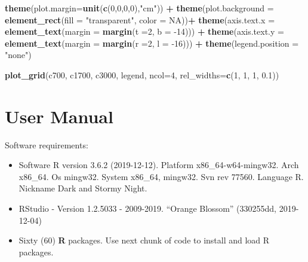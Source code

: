 \documentclass[12pt,oneside]{reedthesis}
\newenvironment{Shaded}{\begin{snugshade}}{\end{snugshade}}
\newcommand{\DataTypeTok}[1]{\textcolor[rgb]{0.13,0.29,0.53}{#1}}
\newcommand{\DecValTok}[1]{\textcolor[rgb]{0.00,0.00,0.81}{#1}}
\newcommand{\FloatTok}[1]{\textcolor[rgb]{0.00,0.00,0.81}{#1}}
\newcommand{\KeywordTok}[1]{\textcolor[rgb]{0.13,0.29,0.53}{\textbf{#1}}}
\newcommand{\NormalTok}[1]{#1}
\newcommand{\OperatorTok}[1]{\textcolor[rgb]{0.81,0.36,0.00}{\textbf{#1}}}
\newcommand{\OtherTok}[1]{\textcolor[rgb]{0.56,0.35,0.01}{#1}}
\newcommand{\StringTok}[1]{\textcolor[rgb]{0.31,0.60,0.02}{#1}}
\providecommand{\tightlist}{%
  \setlength{\itemsep}{0pt}\setlength{\parskip}{0pt}}
\begin{document}
\begin{Shaded}
\begin{Highlighting}[]
\StringTok{  }\KeywordTok{theme}\NormalTok{(}\DataTypeTok{plot.margin=}\KeywordTok{unit}\NormalTok{(}\KeywordTok{c}\NormalTok{(}\DecValTok{0}\NormalTok{,}\DecValTok{0}\NormalTok{,}\DecValTok{0}\NormalTok{,}\DecValTok{0}\NormalTok{),}\StringTok{"cm"}\NormalTok{)) }\OperatorTok{+}
\StringTok{  }\KeywordTok{theme}\NormalTok{(}\DataTypeTok{plot.background =} \KeywordTok{element_rect}\NormalTok{(}\DataTypeTok{fill =} \StringTok{"transparent"}\NormalTok{, }\DataTypeTok{color =} \OtherTok{NA}\NormalTok{))}\OperatorTok{+}
\StringTok{  }\KeywordTok{theme}\NormalTok{(}\DataTypeTok{axis.text.x =} \KeywordTok{element_text}\NormalTok{(}\DataTypeTok{margin =}  \KeywordTok{margin}\NormalTok{(}\DataTypeTok{t =}\DecValTok{2}\NormalTok{, }\DataTypeTok{b =} \DecValTok{-14}\NormalTok{))) }\OperatorTok{+}\StringTok{ }
\StringTok{  }\KeywordTok{theme}\NormalTok{(}\DataTypeTok{axis.text.y =} \KeywordTok{element_text}\NormalTok{(}\DataTypeTok{margin =}  \KeywordTok{margin}\NormalTok{(}\DataTypeTok{r =}\DecValTok{2}\NormalTok{, }\DataTypeTok{l =} \DecValTok{-16}\NormalTok{))) }\OperatorTok{+}
\StringTok{  }\KeywordTok{theme}\NormalTok{(}\DataTypeTok{legend.position =} \StringTok{"none"}\NormalTok{)}

\KeywordTok{plot_grid}\NormalTok{(c700, c1700, c3000, legend, }\DataTypeTok{ncol=}\DecValTok{4}\NormalTok{, }\DataTypeTok{rel_widths=}\KeywordTok{c}\NormalTok{(}\DecValTok{1}\NormalTok{, }\DecValTok{1}\NormalTok{, }\DecValTok{1}\NormalTok{, }\FloatTok{0.1}\NormalTok{))}
\end{Highlighting}
\end{Shaded}
\normalsize

\hypertarget{manual}{%
\chapter{User Manual}\label{manual}}

Software requirements:
\begin{itemize}
\tightlist
\item
  Software R version 3.6.2 (2019-12-12). Platform x86\_64-w64-mingw32. Arch x86\_64. Os mingw32. System x86\_64, mingw32. Svn rev 77560. Language R. Nickname Dark and Stormy Night.
\item
  RStudio - Version 1.2.5033 - 2009-2019. ``Orange Blossom'' (330255dd, 2019-12-04)
\item
  Sixty (60) \textbf{R} packages. Use next chunk of code to install and load R packages.
\end{itemize}
\tiny
\end{document}
